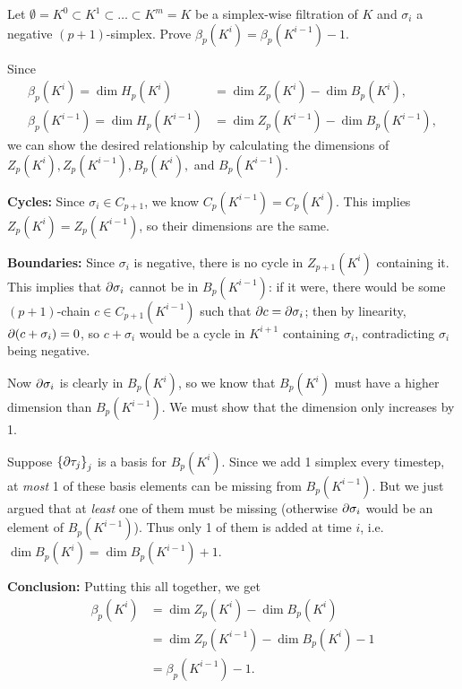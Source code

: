 \documentclass[twoside,10pt]{article}
\begin{document}

\begin{exer}
	Let $\emptyset = K^0 \subset K^1 \subset \dots \subset K^m = K$ be a simplex-wise filtration of $K$ and $\sigma_i$ a negative $(p+1)$-simplex. Prove $\beta_p(K^i) = \beta_p(K^{i-1}) - 1$.
\end{exer}

Since
\begin{align*}
	\beta_p(K^{i}) = \dim H_{p}(K^{i}) &= \dim Z_{p}(K^{i}) - \dim B_{p}(K^{i}),\\
	\beta_p(K^{i-1}) = \dim H_{p}(K^{i-1}) &= \dim Z_{p}(K^{i-1}) - \dim B_{p}(K^{i-1}),
\end{align*}
we can show the desired relationship by calculating the dimensions of $Z_{p}(K^{i}), Z_{p}(K^{i-1}), B_{p}(K^{i}),$ and $B_{p}(K^{i-1})$.

\textbf{Cycles:} Since $\sigma_i \in C_{p+1}$, we know $C_{p}(K^{i-1})=C_{p}(K^{i})$. This implies $Z_{p}(K^{i}) = Z_{p}(K^{i-1})$, so their dimensions are the same.

\textbf{Boundaries:} Since $\sigma_i$ is negative, there is no cycle in $Z_{p+1}(K^{i})$ containing it. This implies that $\partial \sigma_i$ cannot be in $B_{p}(K^{i-1})$: if it were, there would be some $(p+1)$-chain $c \in C_{p+1}(K^{i-1})$ such that $\partial c = \partial \sigma_i$; then by linearity, $\partial(c + \sigma_i)=0$, so $c+\sigma_i$ would be a cycle in $K^{i+1}$ containing $\sigma_i$, contradicting $\sigma_i$ being negative.

Now $\partial \sigma_i$ is clearly in $B_{p}(K^{i})$, so we know that $B_{p}(K^{i})$ must have a higher dimension than $B_{p}(K^{i-1})$. We must show that the dimension only increases by 1.

Suppose $\left\{ \partial \tau_j \right\}_{j}$ is a basis for $B_{p}(K^{i})$. Since we add 1 simplex every timestep, at \textit{most} 1 of these basis elements can be missing from $B_{p}(K^{i-1})$. But we just argued that at \textit{least} one of them must be missing (otherwise $\partial \sigma_i$ would be an element of $B_{p}(K^{i-1})$). Thus only 1 of them is added at time $i$, i.e. $\dim B_{p}(K^{i}) = \dim B_{p}(K^{i-1})+1$.

\textbf{Conclusion:} Putting this all together, we get
\begin{align*}
	\beta_{p}(K^{i}) &= \dim Z_{p}(K^{i}) - \dim B_{p}(K^{i}) \\
			 &= \dim Z_{p}(K^{i-1}) - \dim B_{p}(K^{i}) - 1 \\
			 &= \beta_{p}(K^{i-1}) - 1.
\end{align*}
\end{document}
